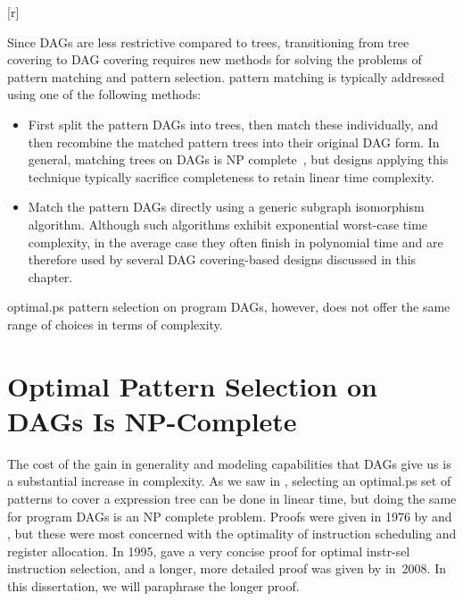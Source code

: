 \begin{inParFigure}{\inparfigwidth}[r]%
  \vspace*{2\baselineskip}
\end{inParFigure}%
Since \glspl{DAG} are less restrictive compared to \glspl{tree}, transitioning
from \gls{tree covering} to \gls{DAG covering} requires new methods for solving
the problems of \gls{pattern matching} and \gls{pattern selection}.
%
\Gls{pattern
  matching} is typically addressed using one of the following methods:
\begin{itemize}
  \item First split the \glspl{pattern DAG} into \glspl{tree}, then match these
    individually, and then recombine the matched \glspl{pattern tree} into their
    original \gls{DAG} form.
%
In general, matching \glspl{tree} on \glspl{DAG} is
    \gls{NP complete}~\cite{Garey1979}, but designs applying this technique
    typically sacrifice completeness to retain linear time complexity.
  \item Match the \glspl{pattern DAG} directly using a generic \gls{subgraph
    isomorphism} algorithm.
%
Although such algorithms exhibit exponential
    worst-case time complexity, in the average case they often finish in
    polynomial time and are therefore used by several \gls{DAG covering}-based
    designs discussed in this chapter.
\end{itemize}

\Gls{optimal.ps} \gls{pattern selection} on \glspl{program DAG}, however,
does not offer the same range of choices in terms of complexity.


\section{Optimal Pattern Selection on DAGs Is NP-Complete}

The cost of the gain in generality and modeling capabilities that \glspl{DAG}
give us is a substantial increase in complexity.
%
As we saw in
, selecting an \gls{optimal.ps} set of
\glspl{pattern} to cover a \gls{expression tree} can be done in linear time, but
doing the same for \glspl{program DAG} is an \gls{NP complete} problem.
%
Proofs
were given in 1976 by \textcite{Bruno1976} and \textcite{Aho1976b}, but
these were most concerned with the optimality of \gls{instruction scheduling}
and \gls{register allocation}.
%
In 1995, \textcite{Proebsting1995b} gave a very
concise proof for \gls{optimal instr-sel} \gls{instruction selection}, and
a longer, more detailed proof was given by \textcite{Koes2008} in~2008.
%
In this
dissertation, we will paraphrase the longer proof.


